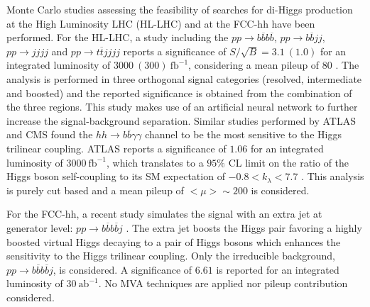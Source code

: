 Monte Carlo studies assessing the feasibility of searches for di-Higgs production at the High Luminosity LHC (HL-LHC) and at the FCC-hh have been performed. For the HL-LHC, a study including the $pp\rightarrow b\overline{b}b\overline{b}$, $pp\rightarrow b\overline{b}jj$, $pp\rightarrow jjjj$ and $pp\rightarrow t\overline{t}jjjj$ reports a significance of $S/\sqrt{B}=3.1~(1.0)$ for an integrated luminosity of $3000~(300)~\text{fb}^{-1}$, considering a mean pileup of $80$ \cite{hhFeasibility}. The analysis is performed in three orthogonal signal categories (resolved, intermediate and boosted) and the reported significance is obtained from the combination of the three regions. This study makes use of an artificial neural network to further increase the signal-background separation. Similar studies performed by ATLAS and CMS found the $hh\rightarrow b\overline{b}\gamma\gamma$ channel to be the most sensitive to the Higgs trilinear coupling. ATLAS reports a significance of $1.06$ for an integrated luminosity of $3000~\text{fb}^{-1}$, which translates to a $95\%$ CL limit on the ratio of the Higgs boson self-coupling to its SM expectation of $-0.8<k_{\lambda}<7.7$ \cite{ATLAShh2bbAA_HL}. This analysis is purely cut based and a mean pileup of $<\mu>\sim 200$ is considered. 

For the FCC-hh, a recent study simulates the signal with an extra jet at generator level: $pp\rightarrow b\overline{b}b\overline{b}j$ \cite{hh+jet_100TeV}. The extra jet boosts the Higgs pair favoring a highly boosted virtual Higgs decaying to a pair of Higgs bosons which enhances the sensitivity to the Higgs trilinear coupling. Only the irreducible background, $pp\rightarrow b\overline{b}b\overline{b}j$, is considered. A significance of $6.61$ is reported for an integrated luminosity of $30~\text{ab}^{-1}$. No MVA techniques are applied nor pileup contribution considered.

